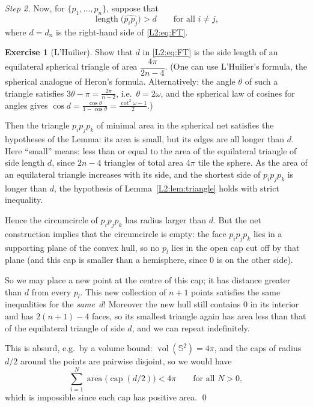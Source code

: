 \documentclass[11pt,openany]{book}
\theoremstyle{plain}
\theoremstyle{definition}
\newtheorem{exercise}[theorem]{Exercise}
\theoremstyle{remark}
\newcommand{\added}[1]{{\color{addcol}#1}}
\newcommand{\Sph}{\mathbb{S}}          %
\newcommand{\vol}{\operatorname{vol}}
\begin{document}
\emph{Step 2.} Now, for $\{p_1,\dots,p_n\}$, suppose that
\[
\operatorname{length}\bigl(\widehat{p_ip_j}\bigr) > d \qquad\text{for all } i\ne j,
\]
where $d=d_n$ is the right-hand side of \eqref{L2:eq:FT}.

\begin{exercise}[L'Huilier]\label{L2:ex:Lhuilier}
Show that $d$ in \eqref{L2:eq:FT} is the side length of an equilateral spherical triangle of area
$\dfrac{4\pi}{2n-4}$. \added{(One can use L'Huilier's formula, the spherical analogue of Heron's formula.
Alternatively: the angle $\theta$ of such a triangle satisfies $3\theta-\pi=\frac{2\pi}{n-2}$, i.e.\
$\theta=2\omega$, and the spherical law of cosines for angles gives
$\cos d=\frac{\cos\theta}{1-\cos\theta}=\frac{\cot^2\omega-1}{2}$.)}
\end{exercise}

Then the triangle $p_ip_jp_k$ of minimal area in the spherical net satisfies the hypotheses of the Lemma:
its area is small, but its edges are all longer than $d$. Here ``small'' means: less than or equal to
the area of the equilateral triangle of side length $d$\added{, since $2n-4$ triangles of total area $4\pi$
tile the sphere. As the area of an equilateral triangle increases with its side, and the shortest side of
$p_ip_jp_k$ is longer than $d$, the hypothesis of Lemma~\ref{L2:lem:triangle} holds with strict
inequality.}

Hence the circumcircle of $p_ip_jp_k$ has radius larger than $d$. But the net construction implies that
the circumcircle is empty\added{: the face $p_ip_jp_k$ lies in a supporting plane of the convex hull, so no
$p_l$ lies in the open cap cut off by that plane (and this cap is smaller than a hemisphere, since $0$ is on
the other side)}.

So we may place a new point at the centre \added{of this cap; it has distance greater than $d$ from every
$p_l$}. This new collection of $n+1$ points satisfies the same inequalities for the \emph{same}~$d$!
\added{Moreover the new hull still contains $0$ in its interior and has $2(n+1)-4$ faces, so its smallest
triangle again has area less than that of the equilateral triangle of side $d$, and we can repeat
indefinitely.}

This is absurd, e.g.\ by a volume bound: $\vol(\Sph^2)=4\pi$, and \added{the caps of radius $d/2$ around the
points are pairwise disjoint, so} we would have
\[
\sum_{i=1}^{N}\operatorname{area}\bigl(\operatorname{cap}(d/2)\bigr) < 4\pi \qquad\text{for all } N>0,
\]
\added{which is impossible since each cap has positive area.} \qed
\end{document}
